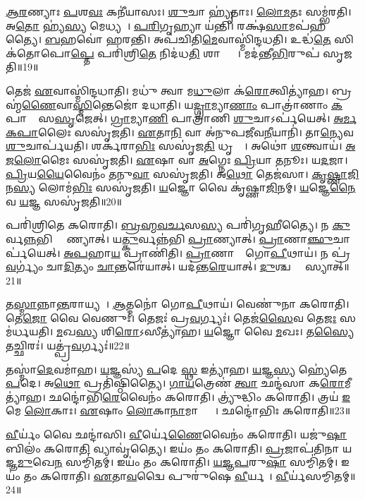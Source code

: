 \ul{𑌆}\ul{𑌰}𑌣𑍍𑌯𑌾𑌃 \ul{𑌪}𑌶\ul{𑌵𑌃} 𑌕𑌨𑍀॑𑌯𑌾𑌸𑌃। 
\ul{𑌶𑍁}𑌚𑌾 𑌹𑍍𑌯𑍃॑𑌤𑌾𑌃। 
\ul{𑌲𑍋}\ul{𑌮}𑌤𑌃 𑌸𑌮𑍍𑌭॑𑌰𑌤𑌿। 
𑌅\ul{𑌤𑍋} 𑌹𑍍𑌯॑\ul{𑌸𑍍𑌯} 𑌮𑍇𑌧𑍍𑌯𑌮𑍍᳚। 
\ul{𑌪}\ul{𑌰𑌿}𑌗𑍃𑌹𑍍𑌯𑌾 𑌯॑𑌨𑍍𑌤𑌿। 
𑌰𑌕𑍍𑌷॑\ul{𑌸𑌾}𑌮𑌪॑𑌹𑌤𑍍𑌯𑍈। 
\ul{𑌬}𑌹𑌵𑍋॑ 𑌹𑌰𑌨𑍍𑌤𑌿। 
𑌅𑌪॑𑌚𑌿𑌤𑌿\ul{𑌮𑍇}𑌵𑌾𑌸𑍍𑌮𑌿॑𑌨𑍍𑌦𑌧𑌤𑌿। 
𑌉𑌦𑍍𑌧॑\ul{𑌤𑍇} 𑌸𑌿𑌕॑𑌤𑍋𑌪𑍋\ul{𑌪𑍍𑌤𑍇} 𑌪𑌰𑌿॑𑌶𑍍𑌰𑌿\ul{𑌤𑍇} 𑌨𑌿𑌦॑𑌧\ul{𑌤𑌿} 𑌶𑌾𑌨𑍍𑌤𑍍𑌯𑍈᳚। 
𑌮𑌦॑𑌨𑍍𑌤𑍀\ul{𑌭𑌿}𑌰𑍁𑌪॑ 𑌸𑍃𑌜𑌤𑌿॥19॥

𑌤𑍇𑌜॑ \ul{𑌏}𑌵𑌾𑌸𑍍𑌮𑌿॑𑌨𑍍𑌦𑌧𑌾𑌤𑌿। 
𑌮𑌧𑍁॑ 𑌤𑍍𑌵𑌾 𑌮\ul{𑌧𑍁}𑌲𑌾 𑌕॑\ul{𑌰𑍋}𑌤𑍍𑌵𑌿𑌤𑍍𑌯𑌾॑𑌹। 
𑌬𑍍𑌰𑌹𑍍𑌮॑\ul{𑌣𑍈}𑌵𑌾\ul{𑌸𑍍𑌮𑌿}𑌨𑍍𑌤𑍇𑌜𑍋॑ 𑌦𑌧𑌾𑌤𑌿। 
𑌯\ul{𑌦𑍍𑌗𑍍𑌰𑌾}𑌮𑍍𑌯𑌾\ul{𑌣𑌾𑌂} 𑌪𑌾𑌤𑍍𑌰𑌾॑𑌣𑌾𑌂 \ul{𑌕}𑌪𑌾𑌲𑍈𑌃᳚ 𑌸\ul{𑌸𑍃}𑌜𑍇𑌤𑍍। 
\ul{𑌗𑍍𑌰𑌾}𑌮𑍍𑌯𑌾\ul{𑌣𑌿} 𑌪𑌾𑌤𑍍𑌰𑌾॑𑌣𑌿 \ul{𑌶𑍁}𑌚𑌾𑌽𑌰𑍍𑌪॑𑌯𑍇𑌤𑍍। 
\ul{𑌅}\ul{𑌰𑍍𑌮}\ul{𑌕}\ul{𑌪𑌾}𑌲𑍈𑌃 𑌸𑌸𑍃॑𑌜𑌤𑌿। 
\ul{𑌏}𑌤𑌾\ul{𑌨𑌿} 𑌵𑌾 𑌅॑𑌨𑍁𑌪𑌜𑍀𑌵\ul{𑌨𑍀}𑌯𑌾𑌨𑌿॑। 
𑌤𑌾\ul{𑌨𑍍𑌯𑍇}𑌵 \ul{𑌶𑍁}𑌚𑌾𑌰𑍍𑌪॑𑌯𑌤𑌿। 
𑌶𑌰𑍍𑌕॑𑌰𑌾\ul{𑌭𑌿𑌃} 𑌸𑌸𑍃॑𑌜\ul{𑌤𑌿} 𑌧𑍃𑌤𑍍𑌯𑍈᳚। 
𑌅𑌥𑍋॑ \ul{𑌶}𑌨𑍍𑌤𑍍𑌵𑌾𑌯॑। 
\ul{𑌅}\ul{𑌜}\ul{𑌲𑍋}𑌮𑍈𑌃 𑌸𑌸𑍃॑𑌜𑌤𑌿। 
\ul{𑌏}𑌷𑌾 𑌵𑌾 \ul{𑌅}𑌗𑍍𑌨𑍇𑌃 \ul{𑌪𑍍𑌰𑌿}𑌯𑌾 \ul{𑌤}𑌨𑍂𑌃। 
𑌯\ul{𑌦}𑌜𑌾। 
\ul{𑌪𑍍𑌰𑌿}𑌯\ul{𑌯𑍈}𑌵𑍈𑌨𑌂॑ \ul{𑌤}𑌨𑍁\ul{𑌵𑌾} 𑌸𑌸𑍃॑𑌜𑌤𑌿। 
𑌅\ul{𑌥𑍋} 𑌤𑍇𑌜॑𑌸𑌾। 
\ul{𑌕𑍃}\ul{𑌷𑍍𑌣𑌾}\ul{𑌜𑌿}𑌨\ul{𑌸𑍍𑌯} 𑌲𑍋𑌮॑\ul{𑌭𑌿𑌃} 𑌸𑌸𑍃॑𑌜𑌤𑌿। 
\ul{𑌯}𑌜𑍍𑌞𑍋 𑌵𑍈 𑌕𑍃॑𑌷𑍍𑌣𑌾\ul{𑌜𑌿}𑌨𑌮𑍍। 
\ul{𑌯}𑌜𑍍𑌞𑍇\ul{𑌨𑍈}𑌵 \ul{𑌯}𑌜𑍍𑌞 𑌸𑌸𑍃॑𑌜𑌤𑌿॥20॥

𑌪𑌰𑌿॑𑌶𑍍𑌰𑌿𑌤𑍇 𑌕𑌰𑍋𑌤𑌿। 
\ul{𑌬𑍍𑌰}\ul{𑌹𑍍𑌮}\ul{𑌵}\ul{𑌰𑍍𑌚}𑌸\ul{𑌸𑍍𑌯} 𑌪𑌰𑌿॑𑌗𑍃𑌹𑍀𑌤𑍍𑌯𑍈। 
𑌨 \ul{𑌕𑍁}𑌰𑍍𑌵\ul{𑌨𑍍𑌨}𑌭𑌿 𑌪𑍍𑌰𑌾᳚𑌣𑍍𑌯𑌾𑌤𑍍। 
𑌯\ul{𑌤𑍍𑌕𑍁}𑌰𑍍𑌵𑌨𑍍𑌨॑𑌭𑌿 \ul{𑌪𑍍𑌰𑌾}𑌣𑍍𑌯𑌾𑌤𑍍। 
\ul{𑌪𑍍𑌰𑌾}𑌣𑌾\ul{𑌞𑍍𑌛𑍁}𑌚𑌾𑌰𑍍𑌪॑𑌯𑍇𑌤𑍍। 
\ul{𑌅}\ul{𑌪}𑌹𑌾\ul{𑌯} 𑌪𑍍𑌰𑌾𑌣𑌿॑𑌤𑌿। 
\ul{𑌪𑍍𑌰𑌾}𑌣𑌾𑌨𑌾𑌂᳚ 𑌗𑍋\ul{𑌪𑍀}𑌥𑌾𑌯॑। 
𑌨 𑌪𑍍𑌰॑\ul{𑌵}𑌰𑍍𑌗𑍍𑌯𑌂॑ 𑌚𑌾\ul{𑌦𑌿}𑌤𑍍𑌯𑌂 \ul{𑌚𑌾}𑌨𑍍𑌤𑌰𑍇॑𑌯𑌾𑌤𑍍। 
𑌯𑌦॑𑌨𑍍𑌤\ul{𑌰𑍇}𑌯𑌾𑌤𑍍। 
\ul{𑌦𑍁}𑌶𑍍𑌚𑌰𑍍𑌮𑌾᳚ 𑌸𑍍𑌯𑌾𑌤𑍍॥21॥

𑌤\ul{𑌸𑍍𑌮𑌾}𑌨𑍍𑌨𑌾\ul{𑌨𑍍𑌤}𑌰𑌾𑌯𑍍𑌯𑌮𑍍᳚। 
\ul{𑌆}𑌤𑍍𑌮𑌨𑍋॑ 𑌗𑍋\ul{𑌪𑍀}𑌥𑌾𑌯॑। 
𑌵𑍇𑌣𑍁॑𑌨𑌾 𑌕𑌰𑍋𑌤𑌿। 
𑌤𑍇\ul{𑌜𑍋} 𑌵𑍈 𑌵𑍇𑌣𑍁𑌃॑। 
𑌤𑍇𑌜𑌃॑ 𑌪𑍍𑌰\ul{𑌵}𑌰𑍍𑌗𑍍𑌯𑌃॑। 
𑌤𑍇𑌜॑\ul{𑌸𑍈}𑌵 𑌤𑍇\ul{𑌜𑌃} 𑌸𑌮॑𑌰𑍍𑌧𑌯𑌤𑌿। 
\ul{𑌮}𑌖\ul{𑌸𑍍𑌯} 𑌶𑌿\ul{𑌰𑍋}𑌽𑌸𑍀𑌤𑍍𑌯𑌾॑𑌹। 
\ul{𑌯}𑌜𑍍𑌞𑍋 𑌵𑍈 \ul{𑌮}𑌖𑌃। 
𑌤\ul{𑌸𑍍𑌯𑍈}𑌤𑌚𑍍𑌛𑌿𑌰𑌃॑। 
𑌯𑌤𑍍𑌪𑍍𑌰॑\ul{𑌵}𑌰𑍍𑌗𑍍𑌯𑌃॑॥22॥

𑌤𑌸𑍍𑌮𑌾॑\ul{𑌦𑍇}𑌵𑌮𑌾॑𑌹। 
\ul{𑌯}𑌜𑍍𑌞𑌸𑍍𑌯॑ \ul{𑌪}𑌦𑍇 \ul{𑌸𑍍𑌥} 𑌇𑌤𑍍𑌯𑌾॑𑌹। 
\ul{𑌯}𑌜𑍍𑌞\ul{𑌸𑍍𑌯} 𑌹𑍍𑌯𑍇॑𑌤𑍇 \ul{𑌪}𑌦𑍇। 
𑌅\ul{𑌥𑍋} 𑌪𑍍𑌰𑌤𑌿॑𑌷𑍍𑌠𑌿𑌤𑍍𑌯𑍈। 
\ul{𑌗𑌾}\ul{𑌯}𑌤𑍍𑌰𑍇𑌣॑ \ul{𑌤𑍍𑌵𑌾} 𑌛𑌨𑍍𑌦॑𑌸𑌾 𑌕\ul{𑌰𑍋}𑌮𑍀𑌤𑍍𑌯𑌾॑𑌹। 
𑌛𑌨𑍍𑌦𑍋॑𑌭𑌿\ul{𑌰𑍇}𑌵𑍈𑌨𑌂॑ 𑌕𑌰𑍋𑌤𑌿। 
𑌤𑍍𑌰𑍍𑌯𑍁॑𑌦𑍍𑌧𑌿𑌂 𑌕𑌰𑍋𑌤𑌿। 
𑌤𑍍𑌰𑌯॑ \ul{𑌇}𑌮𑍇 \ul{𑌲𑍋}𑌕𑌾𑌃। 
\ul{𑌏}𑌷𑌾𑌂 \ul{𑌲𑍋}𑌕𑌾\ul{𑌨𑌾}𑌮𑌾𑌪𑍍𑌤𑍍𑌯𑍈᳚। 
𑌛𑌨𑍍𑌦𑍋॑𑌭𑌿𑌃 𑌕𑌰𑍋𑌤𑌿॥23॥

\ul{𑌵𑍀}𑌰𑍍𑌯𑌂॑ 𑌵𑍈 𑌛𑌨𑍍𑌦𑌾॑𑌸𑌿। 
\ul{𑌵𑍀}𑌰𑍍𑌯𑍇॑\ul{𑌣𑍈}𑌵𑍈𑌨𑌂॑ 𑌕𑌰𑍋𑌤𑌿। 
𑌯𑌜𑍁॑\ul{𑌷𑌾} 𑌬𑌿𑌲𑌂॑ 𑌕𑌰𑍋\ul{𑌤𑌿} 𑌵𑍍𑌯𑌾𑌵𑍃॑𑌤𑍍𑌯𑍈। 
𑌇𑌯𑌂॑ 𑌤𑌂 𑌕𑌰𑍋𑌤𑌿। 
\ul{𑌪𑍍𑌰}𑌜𑌾𑌪॑𑌤𑌿𑌨𑌾 𑌯𑌜𑍍𑌞\ul{𑌮𑍁}𑌖𑍇\ul{𑌨} 𑌸𑌮𑍍𑌮𑌿॑𑌤𑌮𑍍। 
𑌇𑌯𑌂॑ 𑌤𑌂 𑌕𑌰𑍋𑌤𑌿। 
\ul{𑌯}\ul{𑌜𑍍𑌞}\ul{𑌪}𑌰𑍁\ul{𑌷𑌾} 𑌸𑌮𑍍𑌮𑌿॑𑌤𑌮𑍍। 
𑌇𑌯𑌂॑ 𑌤𑌂 𑌕𑌰𑍋𑌤𑌿। 
\ul{𑌏}𑌤𑌾\ul{𑌵}𑌦𑍍𑌵𑍈 𑌪𑍁𑌰𑍁॑𑌷𑍇 \ul{𑌵𑍀}𑌰𑍍𑌯𑌮𑍍᳚। 
\ul{𑌵𑍀}𑌰𑍍𑌯॑𑌸𑌮𑍍𑌮𑌿𑌤𑌮𑍍॥24॥

